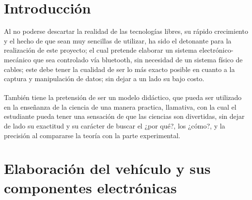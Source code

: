 \documentclass[12]{article}
\begin{document}
\begin{multicols}{2}
\section{Introducción}
Al no poderse descartar la realidad de las tecnologías libres, su rápido crecimiento y el hecho de que sean muy sencillas de utilizar, ha sido el detonante para la realización de este proyecto; el cual pretende elaborar un sistema electrónico-mecánico que sea controlado vía bluetooth, sin necesidad de un sistema físico de cables; este debe tener la cualidad de ser lo más exacto posible en cuanto a la captura y manipulación de datos; sin dejar a un lado su bajo costo. \\\\ También tiene la pretensión de ser un modelo didáctico, que pueda ser utilizado en la enseñanza de la ciencia de una manera practica, llamativa, con la cual el estudiante pueda tener una sensación de que las ciencias son divertidas, sin dejar de lado su exactitud y su carácter de buscar el ¿por qué?,  los ¿cómo?, y la precisión al compararse la teoría con la parte experimental.
\section{Elaboración del vehículo  y sus componentes electrónicas}

\end{multicols}
\end{document}

